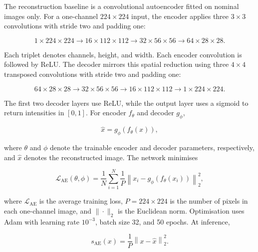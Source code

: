 \documentclass[fleqn,12pt]{olplainarticle}
\begin{document}
The reconstruction baseline is a convolutional autoencoder fitted on nominal
images only. For a one-channel $224\times224$ input, the encoder applies three
$3\times3$ convolutions with stride two and padding one:

\begin{equation}
    1\times224\times224
    \rightarrow
    16\times112\times112
    \rightarrow
    32\times56\times56
    \rightarrow
    64\times28\times28.
    \label{eq:method_ae_encoder_dimensions}
\end{equation}

Each triplet denotes channels, height, and width. Each encoder convolution is
followed by ReLU. The decoder mirrors this spatial reduction using three
$4\times4$ transposed convolutions with stride two and padding one:

\begin{equation}
    64\times28\times28
    \rightarrow
    32\times56\times56
    \rightarrow
    16\times112\times112
    \rightarrow
    1\times224\times224.
    \label{eq:method_ae_decoder_dimensions}
\end{equation}

The first two decoder layers use ReLU, while the output layer uses a sigmoid
to return intensities in $[0,1]$. For encoder
$f_{\theta}$ and decoder $g_{\phi}$,

\begin{equation}
    \widehat{x}
    =
    g_{\phi}\!\left(f_{\theta}(x)\right),
    \label{eq:method_ae_reconstruction}
\end{equation}

where $\theta$ and $\phi$ denote the trainable encoder and decoder parameters,
respectively, and $\widehat{x}$ denotes the reconstructed image. The network
minimises

\begin{equation}
    \mathcal{L}_{\mathrm{AE}}(\theta,\phi)
    =
    \frac{1}{N}
    \sum_{i=1}^{N}
    \frac{1}{P}
    \left\|
        x_i-g_{\phi}(f_{\theta}(x_i))
    \right\|_2^2,
    \label{eq:method_ae_objective}
\end{equation}

where $\mathcal{L}_{\mathrm{AE}}$ is the average training loss,
$P=224\times224$ is the number of pixels in each one-channel image, and
$\|\cdot\|_2$ is the Euclidean norm. Optimisation uses Adam with learning rate
$10^{-3}$, batch size 32, and 50 epochs. At inference,

\begin{equation}
    s_{\mathrm{AE}}(x)
    =
    \frac{1}{P}
    \left\|
        x-\widehat{x}
    \right\|_2^2.
    \label{eq:method_ae_score}
\end{equation}
\end{document}
